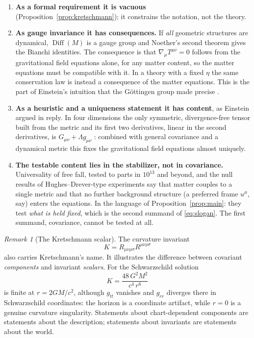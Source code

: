 \documentclass[11pt,a4paper,openany]{book}
\theoremstyle{definition}
\theoremstyle{plain}
\theoremstyle{remark}
\newtheorem{remark}{Remark}[chapter]
\DeclareMathOperator{\Diff}{Diff}
\begin{document}
\begin{enumerate}[leftmargin=1.8em,itemsep=3pt,label=\textbf{\arabic*.}]
\item \textbf{As a formal requirement it is vacuous}
  (Proposition~\ref{prop:kretschmann}); it constrains the notation, not the
  theory.
\item \textbf{As gauge invariance it has consequences.} If \emph{all}
  geometric structures are dynamical, $\Diff(M)$ is a gauge group and
  Noether's second theorem gives the Bianchi identities. The consequence is
  that $\nabla_\mu T^{\mu\nu}=0$ follows from the gravitational field equations
  alone, for any matter content, so the matter equations must be compatible
  with it. In a theory with a fixed $\eta$ the same conservation law is
  instead a consequence of the matter equations. This is the part of Einstein's
  intuition that the G\"ottingen group made precise \cite{ks}.
\item \textbf{As a heuristic and a uniqueness statement it has content}, as
  Einstein argued in reply. In four dimensions the only symmetric,
  divergence-free tensor built from the metric and its first two derivatives,
  linear in the second derivatives, is $G_{\mu\nu}+\Lambda g_{\mu\nu}$
  \cite{lovelock}: combined with general covariance and a dynamical metric this
  fixes the gravitational field equations almost uniquely.
\item \textbf{The testable content lies in the stabilizer, not in
  covariance.} Universality of free fall, tested to parts in $10^{13}$ and
  beyond, and the null results of Hughes--Drever-type experiments say that
  matter couples to a single metric and that no further background structure
  (a preferred frame $u^\mu$, say) enters the equations. In the language of
  Proposition~\ref{prop:main}: they test \emph{what is held fixed}, which is the
  second summand of \eqref{eq:slogan}. The first summand, covariance, cannot be
  tested at all.
\end{enumerate}

\begin{remark}[The Kretschmann scalar]\label{rem:kretschmann-scalar}
The curvature invariant
\begin{equation}
  K=R_{\mu\nu\rho\sigma}R^{\mu\nu\rho\sigma}
\end{equation}
also carries Kretschmann's name. It illustrates the difference between covariant
\emph{components} and invariant \emph{scalars}. For the Schwarzschild solution
\begin{equation}
  K=\frac{48\,G^2M^2}{c^4\,r^6}
\end{equation}
is finite at $r=2GM/c^2$, although $g_{tt}$ vanishes and $g_{rr}$ diverges
there in Schwarzschild coordinates: the horizon is a coordinate artifact,
while $r=0$ is a genuine curvature singularity. Statements about
chart-dependent components are statements about the description; statements
about invariants are statements about the world.
\end{remark}
\end{document}
